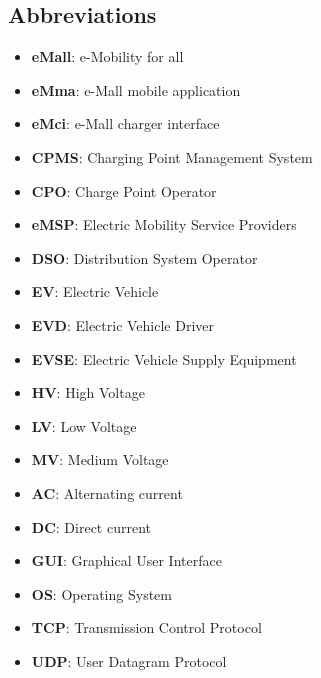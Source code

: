 \subsection{Abbreviations}
\begin{itemize}
    \item \textbf{eMall}: e-Mobility for all
    \item \textbf{eMma}: e-Mall mobile application
    \item \textbf{eMci}: e-Mall charger interface
    \item \textbf{CPMS}: Charging Point Management System
    \item \textbf{CPO}: Charge Point Operator
    \item \textbf{eMSP}: Electric Mobility Service Providers
    \item \textbf{DSO}: Distribution System Operator
    \item \textbf{EV}: Electric Vehicle
    \item \textbf{EVD}: Electric Vehicle Driver
    \item \textbf{EVSE}: Electric Vehicle Supply Equipment
    \item \textbf{HV}: High Voltage
    \item \textbf{LV}: Low Voltage
    \item \textbf{MV}: Medium Voltage
    \item \textbf{AC}: Alternating current
    \item \textbf{DC}: Direct current
    \item \textbf{GUI}: Graphical User Interface
    \item \textbf{OS}: Operating System
    \item \textbf{TCP}: Transmission Control Protocol
    \item \textbf{UDP}: User Datagram Protocol
\end{itemize}

